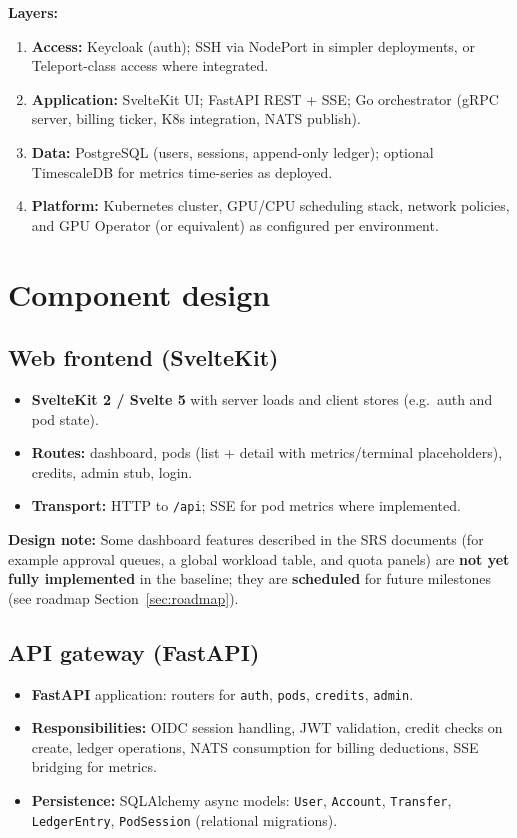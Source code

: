 \documentclass[12pt,a4paper]{article}
\begin{document}
\textbf{Layers:}
\begin{enumerate}[leftmargin=*]
  \item \textbf{Access:} Keycloak (auth); SSH via NodePort in simpler deployments, or Teleport-class access where integrated.
  \item \textbf{Application:} SvelteKit UI; FastAPI REST + SSE; Go orchestrator (gRPC server, billing ticker, K8s integration, NATS publish).
  \item \textbf{Data:} PostgreSQL (users, sessions, append-only ledger); optional TimescaleDB for metrics time-series as deployed.
  \item \textbf{Platform:} Kubernetes cluster, GPU/CPU scheduling stack, network policies, and GPU Operator (or equivalent) as configured per environment.
\end{enumerate}

\section{Component design}
\label{sec:components}

\subsection{Web frontend (SvelteKit)}
\begin{itemize}[leftmargin=*]
  \item \textbf{SvelteKit 2 / Svelte 5} with server loads and client stores (e.g.\ auth and pod state).
  \item \textbf{Routes:} dashboard, pods (list + detail with metrics/terminal placeholders), credits, admin stub, login.
  \item \textbf{Transport:} HTTP to \texttt{/api}; SSE for pod metrics where implemented.
\end{itemize}
\textbf{Design note:} Some dashboard features described in the SRS documents (for example approval queues, a global workload table, and quota panels) are \textbf{not yet fully implemented} in the baseline; they are \textbf{scheduled} for future milestones (see roadmap Section~\ref{sec:roadmap}).

\subsection{API gateway (FastAPI)}
\begin{itemize}[leftmargin=*]
  \item \textbf{FastAPI} application: routers for \texttt{auth}, \texttt{pods}, \texttt{credits}, \texttt{admin}.
  \item \textbf{Responsibilities:} OIDC session handling, JWT validation, credit checks on create, ledger operations, NATS consumption for billing deductions, SSE bridging for metrics.
  \item \textbf{Persistence:} SQLAlchemy async models: \texttt{User}, \texttt{Account}, \texttt{Transfer}, \texttt{LedgerEntry}, \texttt{PodSession} (relational migrations).
\end{itemize}
\end{document}
